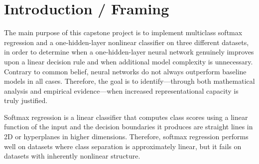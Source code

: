 \documentclass[sigconf,screen,nonacm]{acmart}
\title{\ProjectTitle}
\subtitle{\ProjectType}
\author{Ziyad Muradov}
\affiliation{%
  \institution{\CourseName}
  \country{Azerbaijan}
}
\author{Emin Huseynli}
\affiliation{%
  \institution{\CourseName}
  \country{Azerbaijan}
}
\author{Ismayil Yusifli}
\affiliation{%
  \institution{\CourseName}
  \country{Azerbaijan}
}
\author{Kamal Soltanaliyev}
\affiliation{%
  \institution{\CourseName}
  \country{Azerbaijan}
}
\begin{document}
\begin{abstract}
This report studies when a one-hidden-layer nonlinear classifier meaningfully improves on a linear decision rule, and when additional model complexity is unnecessary. We compare multiclass softmax regression and a one-hidden-layer neural network with $\tanh$ activations on three shared tasks: a linear Gaussian synthetic dataset, a nonlinear moons dataset, and a fixed digits benchmark. Our analysis combines mathematical derivations, controlled experiments, required ablations, failure-case analysis, prediction of reliability and confidence, and repeated-seed evaluation to determine where linear geometry is sufficient, where nonlinear representation changes the problem, and what limitations remain.
\end{abstract}


\maketitle

\section{Introduction / Framing}

The main purpose of this capstone project is to implement multiclass softmax regression and a one-hidden-layer nonlinear classifier on three different datasets, in order to determine when a one-hidden-layer neural network genuinely improves upon a linear decision rule and when additional model complexity is unnecessary.
Contrary to common belief, neural networks do not always outperform baseline models in all cases. Therefore, the goal is to identify---through both mathematical analysis and empirical evidence---when increased representational capacity is truly justified.

Softmax regression is a linear classifier that computes class scores using a linear function of the input and the decision boundaries it produces are straight lines in 2D or hyperplanes in higher dimensions. Therefore, softmax regression performs well on datasets where class separation is approximately linear, but it fails on datasets with inherently nonlinear structure.
\end{document}
